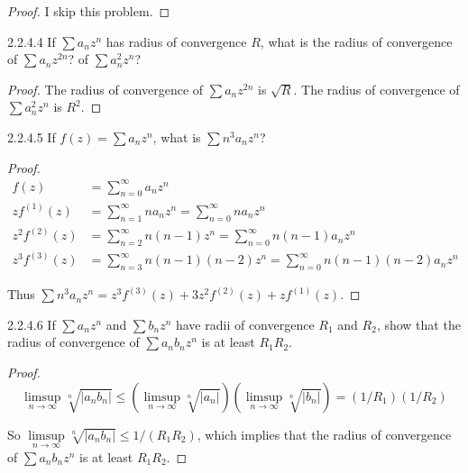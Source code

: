 \begin{proof}
	I skip this problem.
\end{proof}

\begin{problem}{2.2.4.4}
If \( \sum a_{n} z^{n} \) has radius of convergence \( R \), what is the radius of convergence of \( \sum a_{n} z^{2n} \)? of \( \sum a_{n}^{2} z^{n} \)?
\end{problem}

\begin{proof}
	The radius of convergence of \( \sum a_{n} z^{2n} \) is \( \sqrt{R} \). The radius of convergence of \( \sum a_{n}^{2} z^{n} \) is \( R^{2} \).
\end{proof}

\begin{problem}{2.2.4.5}
If \( f(z) = \sum a_{n} z^{n} \), what is \( \sum n^{3} a_{n} z^{n} \)?
\end{problem}

\begin{proof}
	\begingroup
	\allowdisplaybreaks%
	\begin{align*}
		f(z)            & = \sum_{n=0}^{\infty} a_{n}z^{n}                                                           \\
		zf^{(1)}(z)     & = \sum_{n=1}^{\infty} na_{n}z^{n} = \sum_{n=0}^{\infty} na_{n}z^{n}                        \\
		z^{2}f^{(2)}(z) & = \sum_{n=2}^{\infty} n(n - 1)z^{n} = \sum_{n=0}^{\infty} n(n - 1)a_{n}z^{n}               \\
		z^{3}f^{(3)}(z) & = \sum_{n=3}^{\infty} n(n - 1)(n - 2)z^{n} = \sum_{n=0}^{\infty} n(n - 1)(n - 2)a_{n}z^{n}
	\end{align*}
	\endgroup

	Thus \( \sum n^{3}a_{n}z^{n} = z^{3}f^{(3)}(z) + 3z^{2}f^{(2)}(z) + zf^{(1)}(z) \).
\end{proof}

\begin{problem}{2.2.4.6}
If \( \sum a_{n} z^{n} \) and \( \sum b_{n} z^{n} \) have radii of convergence \( R_{1} \) and \( R_{2} \), show that the radius of convergence of \( \sum a_{n} b_{n} z^{n} \) is at least \( R_{1} R_{2} \).
\end{problem}

\begin{proof}
	\[
		\limsup\limits_{n\to\infty} \sqrt[n]{\left\vert a_{n}b_{n} \right\vert} \le \left(  \limsup\limits_{n\to\infty} \sqrt[n]{\left\vert a_{n} \right\vert} \right) \left( \limsup\limits_{n\to\infty} \sqrt[n]{\left\vert b_{n} \right\vert}\right) = (1/R_{1})(1/R_{2})
	\]

	So \( \limsup\limits_{n\to\infty} \sqrt[n]{\left\vert a_{n}b_{n} \right\vert} \le 1/(R_{1}R_{2}) \), which implies that the radius of convergence of \( \sum a_{n} b_{n} z^{n} \) is at least \( R_{1} R_{2} \).
\end{proof}

